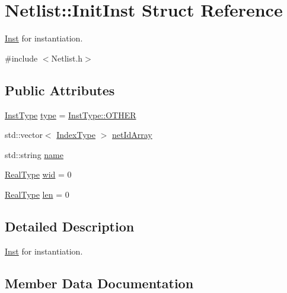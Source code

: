 \hypertarget{structNetlist_1_1InitInst}{}\section{Netlist\+:\+:Init\+Inst Struct Reference}
\label{structNetlist_1_1InitInst}


\hyperlink{classInst}{Inst} for instantiation.  




{\ttfamily \#include $<$Netlist.\+h$>$}

\subsection*{Public Attributes}
\begin{DoxyCompactItemize}
\item 
\hyperlink{type_8h_a53644c687d6bc203d9d3d3ee70075f61}{Inst\+Type} \hyperlink{structNetlist_1_1InitInst_a19eaae603a2805874691d6942e0e3400}{type} = \hyperlink{type_8h_a53644c687d6bc203d9d3d3ee70075f61a03570470bad94692ce93e32700d2e1cb}{Inst\+Type\+::\+O\+T\+H\+ER}
\item 
std\+::vector$<$ \hyperlink{type_8h_a581e8093e28e7362f2b6937296190676}{Index\+Type} $>$ \hyperlink{structNetlist_1_1InitInst_a0c1130b16eee45cc956cbff8d989c581}{net\+Id\+Array}
\item 
std\+::string \hyperlink{structNetlist_1_1InitInst_ab15aa94aa397cb0affe046473bf592e6}{name}
\item 
\hyperlink{type_8h_a51898ad9e46b1265f3fab67f7d4b04a2}{Real\+Type} \hyperlink{structNetlist_1_1InitInst_ab330bc688ba619aae2f1e2b64599f6e8}{wid} = 0
\item 
\hyperlink{type_8h_a51898ad9e46b1265f3fab67f7d4b04a2}{Real\+Type} \hyperlink{structNetlist_1_1InitInst_a913df6563e26da7c753db4c0bf7834b4}{len} = 0
\end{DoxyCompactItemize}


\subsection{Detailed Description}
\hyperlink{classInst}{Inst} for instantiation. 

\subsection{Member Data Documentation}
\mbox{\label{structNetlist_1_1InitInst_a913df6563e26da7c753db4c0bf7834b4}} 
